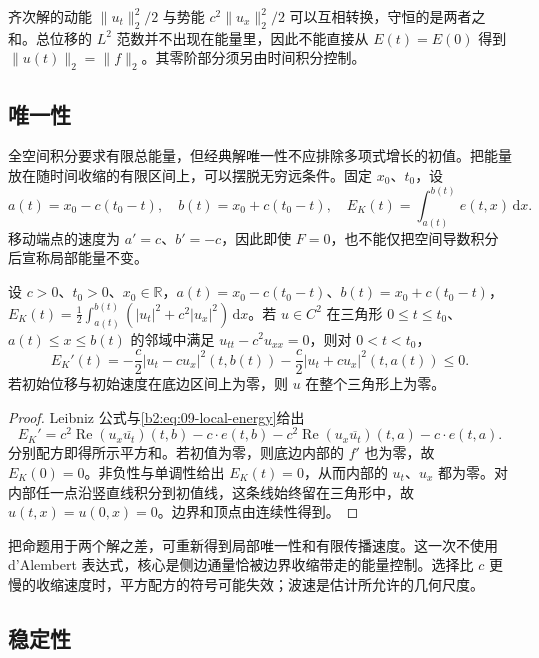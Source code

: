 齐次解的动能 \(\|u_t\|_2^2/2\) 与势能 \(c^2\|u_x\|_2^2/2\) 可以互相转换，守恒的是两者之和。总位移的 \(L^2\) 范数并不出现在能量里，因此不能直接从 \(E(t)=E(0)\) 得到 \(\|u(t)\|_2=\|f\|_2\)。其零阶部分须另由时间积分控制。

\subsection{唯一性}
\label{b2:subsec:090302}

全空间积分要求有限总能量，但经典解唯一性不应排除多项式增长的初值。把能量放在随时间收缩的有限区间上，可以摆脱无穷远条件。固定 \(x_0\)、\(t_0\)，设
\[
 a(t)=x_0-c(t_0-t),\quad b(t)=x_0+c(t_0-t),\quad
 E_K(t)=\int_{a(t)}^{b(t)}e(t,x)\,\mathrm{d}x.
\]
移动端点的速度为 \(a'=c\)、\(b'=-c\)，因此即使 \(F=0\)，也不能仅把空间导数积分后宣称局部能量不变。

\begin{proposition}[收缩区间的能量]\label{b2:prop:09-cone-energy}
设 \(c>0\)、\(t_0>0\)、\(x_0\in\mathbb R\)，\(a(t)=x_0-c(t_0-t)\)、\(b(t)=x_0+c(t_0-t)\)，\(E_K(t)=\frac12\int_{a(t)}^{b(t)}(|u_t|^2+c^2|u_x|^2)\,\mathrm dx\)。若 \(u\in C^2\) 在三角形 \(0\leq t\leq t_0\)、\(a(t)\leq x\leq b(t)\) 的邻域中满足 \(u_{tt}-c^2u_{xx}=0\)，则对 \(0<t<t_0\)，
\[
 E_K'(t)=-\dfrac c2|u_t-cu_x|^2(t,b(t))
             -\dfrac c2|u_t+cu_x|^2(t,a(t))\leq0.
\]
若初始位移与初始速度在底边区间上为零，则 \(u\) 在整个三角形上为零。
\end{proposition}
\begin{proof}
Leibniz 公式与\eqref{b2:eq:09-local-energy}给出
\[
 E_K'=c^2\operatorname{Re}(u_x\overline{u_t})(t,b)-c\cdot e(t,b)
       -c^2\operatorname{Re}(u_x\overline{u_t})(t,a)-c\cdot e(t,a).
\]
分别配方即得所示平方和。若初值为零，则底边内部的 \(f'\) 也为零，故 \(E_K(0)=0\)。非负性与单调性给出 \(E_K(t)=0\)，从而内部的 \(u_t\)、\(u_x\) 都为零。对内部任一点沿竖直线积分到初值线，这条线始终留在三角形中，故 \(u(t,x)=u(0,x)=0\)。边界和顶点由连续性得到。
\end{proof}

把命题用于两个解之差，可重新得到局部唯一性和有限传播速度。这一次不使用 d'Alembert 表达式，核心是侧边通量恰被边界收缩带走的能量控制。选择比 \(c\) 更慢的收缩速度时，平方配方的符号可能失效；波速是估计所允许的几何尺度。

\subsection{稳定性}
\label{b2:subsec:090303}

